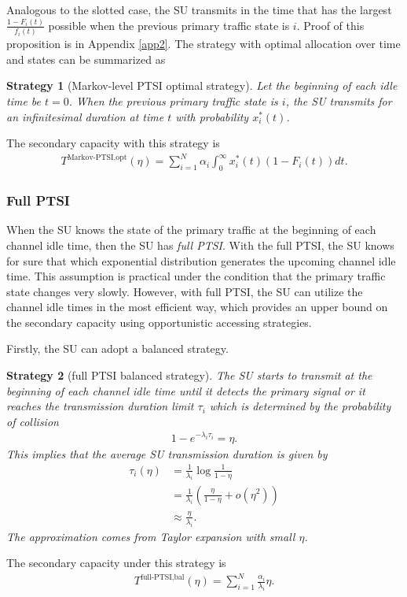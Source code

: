 \documentclass[10pt,final,journal,letterpaper]{IEEEtran}
\newtheorem{strategy}{Strategy}
\begin{document}
Analogous to the slotted case, the SU transmits in the time that has the largest $\frac{1-F_i(t)}{f_i(t)}$ possible when the previous primary traffic state is $i$. Proof of this proposition is in Appendix \ref{app2}. The strategy with optimal allocation over time and states can be summarized as
\begin{strategy}[Markov-level PTSI optimal strategy]
Let the beginning of each idle time be $t=0$. When the previous primary traffic state is $i$, the SU transmits for an infinitesimal duration at time $t$ with probability $x_i^{\ast}(t)$.
\end{strategy}
The secondary capacity with this strategy is
\begin{align}
    T^{\text{Markov-PTSI,opt}}(\eta)=\sum_{i=1}^N\alpha_i\int_0^{\infty}x_i^{\ast}(t)(1-F_i(t))dt.
\end{align}

\subsubsection{Full PTSI}
When the SU knows the state of the primary traffic at the beginning of each channel idle time, then the SU has \emph{full PTSI}. With the full PTSI, the SU knows for sure that which exponential distribution generates the upcoming channel idle time. This assumption is practical under the condition that the primary traffic state changes very slowly. However, with full PTSI, the SU can utilize the channel idle times in the most efficient way, which provides an upper bound on the secondary capacity using opportunistic accessing strategies.

\par
Firstly, the SU can adopt a balanced strategy.
\begin{strategy}[full PTSI balanced strategy]
The SU starts to transmit at the beginning of each channel idle time until it detects the primary signal or it reaches the transmission duration limit $\tau_i$ which is determined by the probability of collision
\begin{align}
    1-e^{-\lambda_i\tau_i}=\eta.\nonumber
\end{align}
This implies that the average SU transmission duration is given by
\begin{align}
    \tau_i(\eta)&=\frac{1}{\lambda_i}\log\frac{1}{1-\eta}\nonumber\\
    &=\frac{1}{\lambda_i}(\frac{\eta}{1-\eta}+o(\eta^2))\nonumber\\
    &\approx\frac{\eta}{\lambda_i}.\nonumber
\end{align}
The approximation comes from Taylor expansion with small $\eta$.
\end{strategy}
The secondary capacity under this strategy is
\begin{align}\label{sec3eq11}
    T^{\text{full-PTSI,bal}}(\eta)=\sum_{i=1}^N\frac{\alpha_i}{\lambda_i}\eta.
\end{align}
\end{document}
